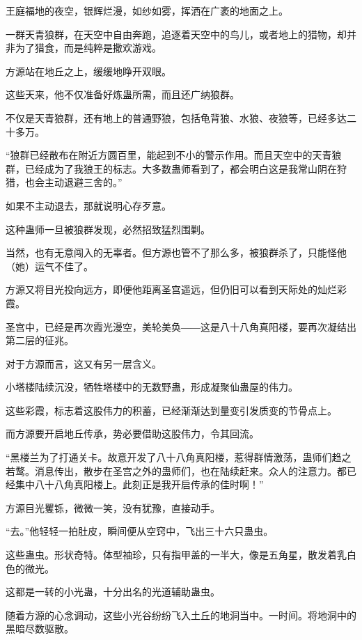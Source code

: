 
\begin{this_body}

王庭福地的夜空，银辉烂漫，如纱如雾，挥洒在广袤的地面之上。

一群天青狼群，在天空中自由奔跑，追逐着天空中的鸟儿，或者地上的猎物，却并非为了猎食，而是纯粹是撒欢游戏。

方源站在地丘之上，缓缓地睁开双眼。

这些天来，他不仅准备好炼蛊所需，而且还广纳狼群。

不仅是天青狼群，还有地上的普通野狼，包括龟背狼、水狼、夜狼等，已经多达二十多万。

“狼群已经散布在附近方圆百里，能起到不小的警示作用。而且天空中的天青狼群，已经成为了我狼王的标志。大多数蛊师看到了，都会明白这是我常山阴在狩猎，也会主动退避三舍的。”

如果不主动退去，那就说明心存歹意。

这种蛊师一旦被狼群发现，必然招致猛烈围剿。

当然，也有无意闯入的无辜者。但方源也管不了那么多，被狼群杀了，只能怪他（她）运气不佳了。

方源又将目光投向远方，即便他距离圣宫遥远，但仍旧可以看到天际处的灿烂彩霞。

圣宫中，已经是再次霞光漫空，美轮美奂――这是八十八角真阳楼，要再次凝结出第二层的征兆。

对于方源而言，这又有另一层含义。

小塔楼陆续沉没，牺牲塔楼中的无数野蛊，形成凝聚仙蛊屋的伟力。

这些彩霞，标志着这股伟力的积蓄，已经渐渐达到量变引发质变的节骨点上。

而方源要开启地丘传承，势必要借助这股伟力，令其回流。

“黑楼兰为了打通关卡。故意开发了八十八角真阳楼，惹得群情激荡，蛊师们趋之若鹜。消息传出，散步在圣宫之外的蛊师们，也在陆续赶来。众人的注意力。都已经集中八十八角真阳楼上。此刻正是我开启传承的佳时啊！”

方源目光矍铄，微微一笑，没有犹豫，直接动手。

“去。”他轻轻一拍肚皮，瞬间便从空窍中，飞出三十六只蛊虫。

这些蛊虫。形状奇特。体型袖珍，只有指甲盖的一半大，像是五角星，散发着乳白色的微光。

这都是一转的小光蛊，十分出名的光道辅助蛊虫。

随着方源的心念调动，这些小光谷纷纷飞入土丘的地洞当中。一时间。将地洞中的黑暗尽数驱散。


\end{this_body}
